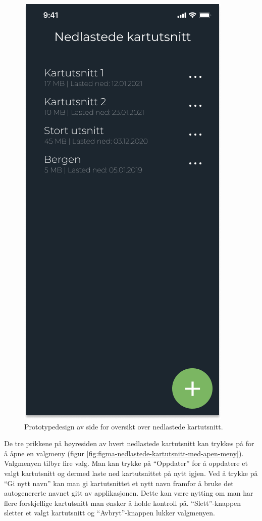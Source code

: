 \begin{figure}[H]
\centering
\captionsetup{width=.8\linewidth}
\includegraphics[scale=0.4]{Figurer/Figma/Frame 4 - Nedlastede kartutsnitt.png}
\caption{Prototypedesign av side for oversikt over nedlastede kartutsnitt.}
\label{fig:figma-nedlastede-kartutsnitt}
\end{figure}
\noindent
De tre prikkene på høyresiden av hvert nedlastede kartutsnitt kan trykkes på for å åpne en valgmeny (figur \ref{fig:figma-nedlastede-kartutsnitt-med-apen-meny}). Valgmenyen tilbyr fire valg. Man kan trykke på \enquote{Oppdater} for å oppdatere et valgt kartutsnitt og dermed laste ned kartutsnittet på nytt igjen. Ved å trykke på \enquote{Gi nytt navn} kan man gi kartutsnittet et nytt navn framfor å bruke det autogenererte navnet gitt av applikasjonen. Dette kan være nytting om man har flere forskjellige kartutsnitt man ønsker å holde kontroll på. \enquote{Slett}-knappen sletter et valgt kartutsnitt og \enquote{Avbryt}-knappen lukker valgmenyen.
